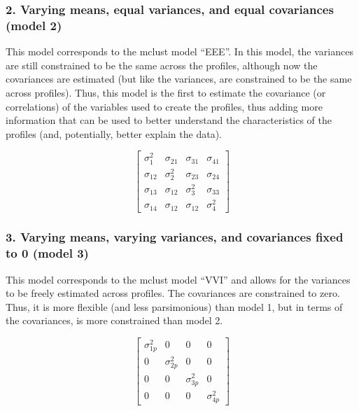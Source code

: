 \documentclass[]{book}
\theoremstyle{definition}
\theoremstyle{definition}
\theoremstyle{definition}
\theoremstyle{remark}
\begin{document}
\subsubsection{2. Varying means, equal variances, and equal covariances
(model
2)}\label{varying-means-equal-variances-and-equal-covariances-model-2}

This model corresponds to the mclust model ``EEE''. In this model, the
variances are still constrained to be the same across the profiles,
although now the covariances are estimated (but like the variances, are
constrained to be the same across profiles). Thus, this model is the
first to estimate the covariance (or correlations) of the variables used
to create the profiles, thus adding more information that can be used to
better understand the characteristics of the profiles (and, potentially,
better explain the data).

\[
\left[ \begin{matrix} { \sigma  }_{ 1 }^{ 2 } & { \sigma  }_{ 21 } & { \sigma  }_{ 31 } & { \sigma  }_{ 41 } \\ { \sigma  }_{ 12 } & { \sigma  }_{ 2 }^{ 2 } & { \sigma  }_{ 23 } & { \sigma  }_{ 24 } \\ { \sigma  }_{ 13 } & { \sigma  }_{ 12 } & { \sigma  }_{ 3 }^{ 2 } & { \sigma  }_{ 33 } \\ { \sigma  }_{ 14 } & { \sigma  }_{ 12 } & { \sigma  }_{ 12 } & { \sigma  }_{ 4 }^{ 2 } \end{matrix} \right] 
\]

\subsubsection{3. Varying means, varying variances, and covariances
fixed to 0 (model
3)}\label{varying-means-varying-variances-and-covariances-fixed-to-0-model-3}

This model corresponds to the mclust model ``VVI'' and allows for the
variances to be freely estimated across profiles. The covariances are
constrained to zero. Thus, it is more flexible (and less parsimonious)
than model 1, but in terms of the covariances, is more constrained than
model 2.

\[ 
\left[ \begin{matrix} { \sigma  }_{ 1p }^{ 2 } & 0 & 0 & 0 \\ 0 & { \sigma  }_{ 2p }^{ 2 } & 0 & 0 \\ 0 & 0 & { \sigma  }_{ 3p }^{ 2 } & 0 \\ 0 & 0 & 0 & { \sigma  }_{ 4p }^{ 2 } \end{matrix} \right] 
\]
\end{document}
